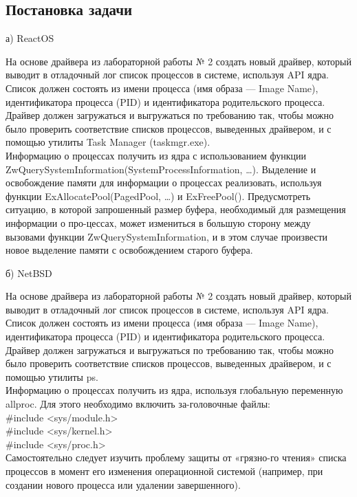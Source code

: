 \documentclass[a4paper, 14pt]{extarticle}
\begin{document}
\begin{center}
\section{Постановка задачи}
а) ReactOS
\end{center}
На основе драйвера из лабораторной работы № 2 создать новый драйвер, который выводит в отладочный лог список процессов  в  системе, используя API  ядра.  Список  должен  состоять  из имени процесса (имя образа — Image Name), идентификатора процесса (PID) и идентификатора родительского процесса.\\  Драйвер  должен загружаться  и  выгружаться по требованию так, чтобы можно было проверить  соответствие списков процессов, выведенных драйвером, и с помощью утилиты Task Manager (taskmgr.exe).\\
Информацию о процессах получить из ядра с использованием функции  ZwQuerySystemInformation(SystemProcessInformation, …). Выделение и освобождение памяти для информации о процессах реализовать,  используя  функции  ExAllocatePool(PagedPool, …) и ExFreePool(). Предусмотреть ситуацию, в  которой запрошенный размер буфера, необходимый для размещения информации о про-цессах,  может  измениться  в большую  сторону  между  вызовами  функции ZwQuerySystemInformation, и в этом случае произвести новое выделение памяти с освобождением старого буфера.

\begin{center}
б) NetBSD
\end{center}
На основе драйвера из лабораторной работы № 2 создать новый драйвер, который выводит в отладочный лог список процессов  в  системе, используя API  ядра.  Список должен  состоять  из имени процесса (имя образа — Image Name), идентификатора процесса (PID) и идентификатора родительского процесса.\\
Драйвер должен загружаться и выгружаться по требованию так, чтобы  можно  было  проверить соответствие  списков  процессов, выведенных драйвером, и с помощью утилиты ps.\\
Информацию  о  процессах получить  из  ядра,  используя  глобальную переменную allproc. Для этого необходимо включить за-головочные файлы:\\
\#include <sys/module.h>\\
\#include <sys/kernel.h>\\
\#include <sys/proc.h>\\
Самостоятельно следует изучить проблему защиты от «грязно-го чтения» списка процессов в момент его изменения операционной системой (например, при создании нового процесса или удалении завершенного).
\end{document}
